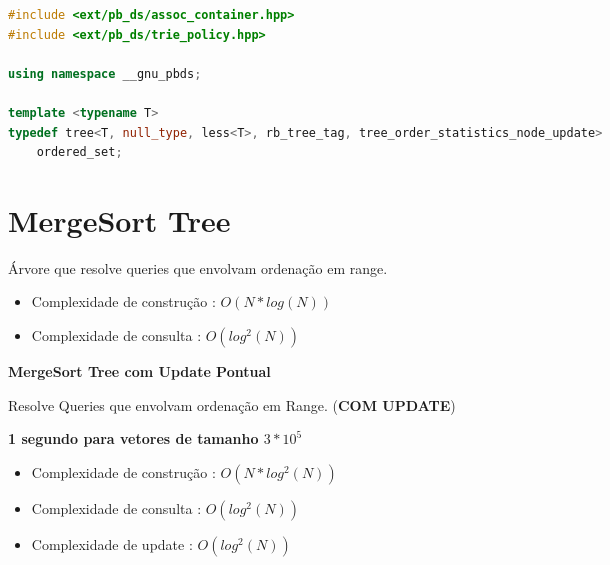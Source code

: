 \documentclass[11pt, a4paper, oneside]{book}
\begin{document}
\hfill

\begin{multicols}{2}
\begin{lstlisting}[language=C++]
#include <ext/pb_ds/assoc_container.hpp>
#include <ext/pb_ds/trie_policy.hpp>

using namespace __gnu_pbds;

template <typename T>
typedef tree<T, null_type, less<T>, rb_tree_tag, tree_order_statistics_node_update>
    ordered_set;\end{lstlisting}
\end{multicols}

\hfill

\section{MergeSort Tree}


Árvore que resolve queries que envolvam ordenação em range.



\begin{itemize}
\item Complexidade de construção : $O(N * log(N))$
\item Complexidade de consulta : $O(log^2(N))$
\end{itemize}



\textbf{MergeSort Tree com Update Pontual} 



Resolve Queries que envolvam ordenação em Range. (\textbf{COM UPDATE})  

\textbf{1 segundo para vetores de tamanho $3 * 10^5$}



\begin{itemize}
\item Complexidade de construção : $O(N * log^2(N))$
\item Complexidade de consulta : $O(log^2(N))$
\item Complexidade de update : $O(log^2(N))$
\end{itemize}

\hfill
\end{document}
